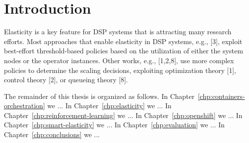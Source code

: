 \chapter{Introduction}
\label{chp:introduction}


\lipsum[1]


Elasticity is a key feature for DSP systems that is attracting many research
efforts. Most approaches that enable elasticity in DSP systems, e.g., [3], exploit
best-effort threshold-based policies based on the utilization of either the system
nodes or the operator instances. Other works, e.g., [1,2,8], use more complex
policies to determine the scaling decisions, exploiting optimization theory [1],
control theory [2], or queueing theory [8].


The remainder of this thesis is organized as follows.
%
In Chapter~\ref{chp:containers-orchestration} we ...
%
In Chapter~\ref{chp:elasticity} we ...
%
In Chapter~\ref{chp:reinforcement-learning} we ...
%
In Chapter~\ref{chp:openshift} we ...
%
In Chapter~\ref{chp:smart-elasticity} we ...
%
In Chapter~\ref{chp:evaluation} we ...
%
In Chapter~\ref{chp:conclusions} we ...
